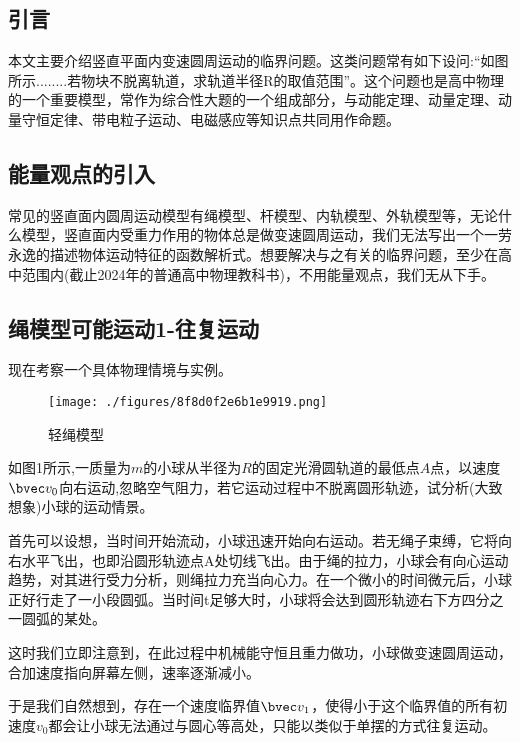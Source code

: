 

\begin{issues}
\issueTODO
\end{issues}

\subsection{引言}
本文主要介绍竖直平面内变速圆周运动的临界问题。这类问题常有如下设问:“如图所示........若物块不脱离轨道，求轨道半径R的取值范围”。这个问题也是高中物理的一个重要模型，常作为综合性大题的一个组成部分，与动能定理、动量定理、动量守恒定律、带电粒子运动、电磁感应等知识点共同用作命题。

\subsection{能量观点的引入}
常见的竖直面内圆周运动模型有绳模型、杆模型、内轨模型、外轨模型等，无论什么模型，竖直面内受重力作用的物体总是做变速圆周运动，我们无法写出一个一劳永逸的描述物体运动特征的函数解析式。想要解决与之有关的临界问题，至少在高中范围内(截止2024年的普通高中物理教科书)，不用能量观点，我们无从下手。

\subsection{绳模型可能运动1-往复运动}
现在考察一个具体物理情境与实例。
\begin{figure}[ht]
\centering
\texttt{[image: ./figures/8f8d0f2e6b1e9919.png]}
\caption{轻绳模型} \label{fig_CirVer_3}
\end{figure}
如图1所示,一质量为$m$的小球从半径为$R$的固定光滑圆轨道的最低点$A$点，以速度$\bvec v_0$向右运动,忽略空气阻力，若它运动过程中不脱离圆形轨迹，试分析(大致想象)小球的运动情景。

首先可以设想，当时间开始流动，小球迅速开始向右运动。若无绳子束缚，它将向右水平飞出，也即沿圆形轨迹点A处切线飞出。由于绳的拉力，小球会有向心运动趋势，对其进行受力分析，则绳拉力充当向心力。在一个微小的时间微元后，小球正好行走了一小段圆弧。当时间t足够大时，小球将会达到圆形轨迹右下方四分之一圆弧的某处。

这时我们立即注意到，在此过程中机械能守恒且重力做功，小球做变速圆周运动，合加速度指向屏幕左侧，速率逐渐减小。

于是我们自然想到，存在一个速度临界值$\bvec v_1$，使得小于这个临界值的所有初速度$v_0$都会让小球无法通过与圆心等高处，只能以类似于单摆的方式往复运动。

